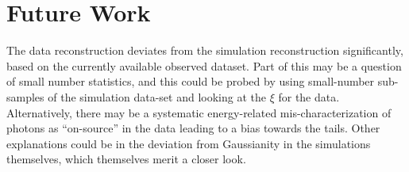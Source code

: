 \documentclass[main.tex]{subfiles}
\begin{document}
\section{Future Work}

The data reconstruction deviates from the simulation reconstruction significantly, based on the currently available observed dataset. Part of this may be a question of small number statistics, and this could be probed by using small-number sub-samples of the simulation data-set and looking at the $\xi$ for the data. Alternatively, there may be a systematic energy-related mis-characterization of photons as ``on-source'' in the data leading to a bias towards the tails. Other explanations could be in the deviation from Gaussianity in the simulations themselves, which themselves merit a closer look.
\end{document}
